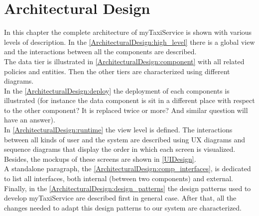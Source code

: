 \documentclass[\mainpath/main]{subfiles}
\begin{document}
\chapter{Architectural Design}
\label{architectural_design}

\setmyfancystyle

In this chapter the complete architecture of myTaxiService is shown with various levels of description. In the \autoref{ArchitecturalDesign:high_level} there is a global view and the interactions between all the components are described.\\ 
The data tier is illustrated in \autoref{ArchitecturalDesign:component} with all related policies and entities. Then the other tiers are characterized using different diagrams.\\
In the \autoref{ArchitecturalDesign:deploy} the deployment of each components is illustrated (for instance the data component is sit in a different place with respect to the other component? It is replaced twice or more? And similar question will have an answer).\\
In \autoref{ArchitecturalDesign:runtime} the view level is defined. The interactions between all kinds of user and the system are described using UX diagrams and sequence diagrams that display the order in which each screen is visualized. Besides, the \glspl{mockup} of these screens are shown in \autoref{UIDesign}.
\\
A standalone paragraph, the \autoref{ArchitecturalDesign:comp_interfaces}, is dedicated to list all interfaces, both internal (between two components) and external.\\
Finally, in the \autoref{ArchitecturalDesign:design_patterns} the design patterns used to develop myTaxiService are described first in general case. After that, all the changes needed to adapt this design patterns to our system are characterized.
\end{document}
